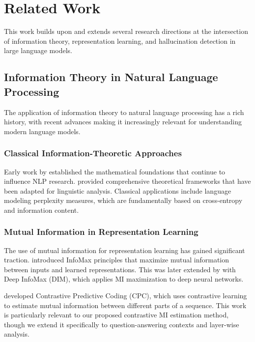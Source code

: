 \section{Related Work}
\label{sec:related_work}

This work builds upon and extends several research directions at the intersection of information theory, representation learning, and hallucination detection in large language models.

\subsection{Information Theory in Natural Language Processing}
\label{subsec:info_theory_nlp}

The application of information theory to natural language processing has a rich history, with recent advances making it increasingly relevant for understanding modern language models.

\subsubsection{Classical Information-Theoretic Approaches}
Early work by \citet{shannon1948mathematical} established the mathematical foundations that continue to influence NLP research. \citet{cover1999elements} provided comprehensive theoretical frameworks that have been adapted for linguistic analysis. Classical applications include language modeling perplexity measures, which are fundamentally based on cross-entropy and information content.

\subsubsection{Mutual Information in Representation Learning}
The use of mutual information for representation learning has gained significant traction. \citet{linsker1988self} introduced InfoMax principles that maximize mutual information between inputs and learned representations. This was later extended by \citet{hjelm2019learning} with Deep InfoMax (DIM), which applies MI maximization to deep neural networks.

\citet{oord2018representation} developed Contrastive Predictive Coding (CPC), which uses contrastive learning to estimate mutual information between different parts of a sequence. This work is particularly relevant to our proposed contrastive MI estimation method, though we extend it specifically to question-answering contexts and layer-wise analysis.

